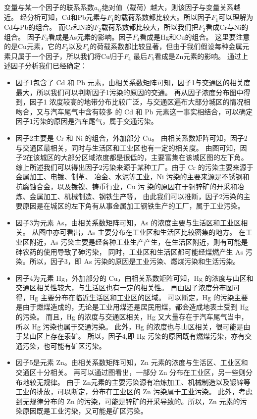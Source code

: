 \documentclass[a4paper]{article}
\begin{document}
变量与某一个因子的联系系数$a_{ij}$绝对值（载荷）越大，则该因子与变量关系越近。
经分析可知，Cd和Pb元素与$F_1$的载荷系数都比较大。所以因子$F_1$可以理解为Cd与Pb的组合。
而Cr和Ni的$F_2$载荷系数都比较大，所以我们把$F_2$看成Cr与Ni的组合。
因子$F_3$看成是As元素的影响。因子$F_4$看成是Hg和Cu的组合。
这里要注意的是Cu元素，它的$F_2$以及$F_4$的荷载系数都比较显著，但由于我们假设每种金属元素只属于一个因子，所以我们将Cu归于$F_4$
最后$F_5$看成是Zn元素的影响。
通过上述因子分析我们已经确定：
\begin{itemize}
\item 因子1包含了 Cd 和 Pb 元素，由相关系数矩阵可知，因子1与交通区的相关度最大，所以我们可以判断因子1污染的原因的交通。
再从因子浓度分布图中得到，因子1 浓度较高的地带分布比较广泛，与交通区遍布大部分城区的情况相吻合，又与汽车尾气中含有较多
的 Cd 和 Pb 元素这一事实相结合，可以确定因子1污染的原因是汽车尾气，属于交通污染。  \\
\item 因子2主要是 Cr 和 Ni 的组合，外加部分 Cu。 
由相关系数矩阵可知，因子2与交通区最相关，同时与生活区和工业区也有一定的相关度。 
由图可知，因子2在该城区的大部分区域浓度都是很低的，主要富集在该城区图的左下角。
综上所述我们可以得出因子2污染来源于某种工厂。由于 Cr 的污染主要来源于金属加工、电镀、制革、
冶金、水泥等工业，Ni 污染的主要来源是不锈钢和抗腐蚀合金，以及镀镍、铸币行业，Cu 污
染的原因在于铜锌矿的开采和冶炼、金属加工、机械制造、钢铁生产等，
由此我们可以推断，因子2污染的主要原因是在城区的左下角有从事金属加工钢铁生产的工厂，属于工业污染。 \\
\item 因子3为元素 As，由相关系数矩阵可知，As 的浓度主要与生活区和工业区相关。
从图中亦可看出，As 主要分布在工业区和生活区比较密集的地方。
在工业区附近，As 污染主要是经各种工业生产产生，在生活区附近，则有可能是砷农药的使用导致了砷污染，
同时，工业区和生活区都可能经煤燃产生 As 污染。所以，因子3，即 As 污染的原因是工业污染、燃煤污染和生活污染。    \\
\item 因子4为元素 Hg，外加部分的 Cu，由相关系数矩阵可知，Hg 的浓度与山区和交通区相关性较大，与生活区也有一定的相关性。
再由因子浓度分布图可得，Hg 主要分布在临近生活区和工业区的区域。
可以断定，Hg 的污染主要是由于燃煤造成的，无论是工业用煤还是居民用煤，都会造成地表土受到 Hg 的污染。
而且，Hg 的浓度与交通区相关，Hg 又大量存在于汽车尾气当中，所以 Hg 污染也属于交通污染。
此外，Hg 的浓度也与山区相关，很可能是由于某山区上存在汞矿。
所以，因子4,即 Hg 污染的原因既有燃煤污染，亦有交通污染，也可能有矿区污染。    \\
\item 因子5是元素 Zn。由相关系数矩阵可知，Zn 元素的浓度与生活区、工业区和交通区十分相关。
再可以通过图看出，一部分 Zn 分布在工业区，另一些则分布地较无规律。
由于 Zn元素的主要污染源有冶炼加工、机械制造以及镀锌等工业的排放，可以断定，分布在工业区的 Zn 污染属于工业污染。
此外，考虑到无规律分布的 Zn 的污染，可能是锌矿的开采导致的。所以，Zn 元素的污染原因既是工业污染，又可能是矿区污染。\\
\end{itemize}
\end{document}
